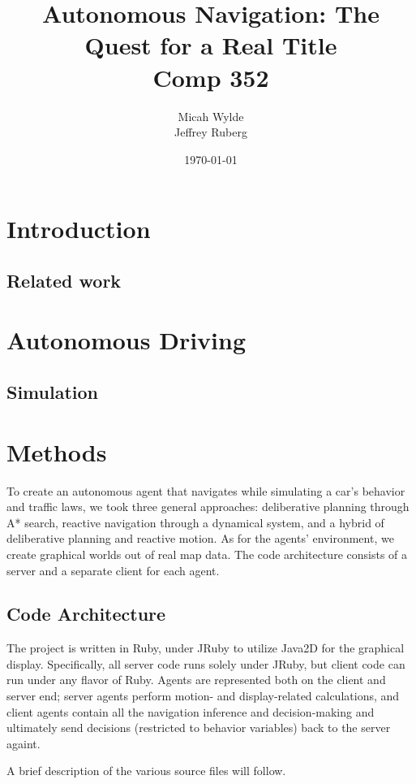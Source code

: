 \documentclass{article}
\author{Micah Wylde\\Jeffrey Ruberg}
\date{\today}
\title{Autonomous Navigation: The Quest for a Real Title\\Comp 352}
\begin{document}
\maketitle

\section{Introduction}

\subsection{Related work}

\section{Autonomous Driving}

\subsection{Simulation}

\section{Methods}

To create an autonomous agent that navigates while simulating a car's behavior
and traffic laws, we took three general approaches: deliberative planning
through A* search, reactive navigation through a dynamical system, and a hybrid
of deliberative planning and reactive motion. As for the agents' environment, we
create graphical worlds out of real map data. The code architecture consists of
a server and a separate client for each agent.

\subsection{Code Architecture}

The project is written in Ruby, under JRuby to utilize Java2D for the graphical
display. Specifically, all server code runs solely under JRuby, but client
code can run under any flavor of Ruby. Agents are represented both on the client
and server end; server agents perform motion- and display-related
calculations, and client agents contain all the navigation inference and
decision-making and ultimately send decisions (restricted to behavior variables)
back to the server againt.

A brief description of the various source files will follow.
\end{document}
